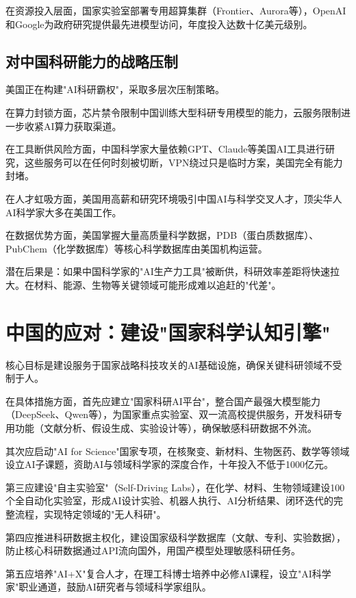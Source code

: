 在资源投入层面，国家实验室部署专用超算集群（Frontier、Aurora等），OpenAI和Google为政府研究提供最先进模型访问，年度投入达数十亿美元级别。

\subsection{对中国科研能力的战略压制}

美国正在构建"AI科研霸权"，采取多层次压制策略。

在算力封锁方面，芯片禁令限制中国训练大型科研专用模型的能力，云服务限制进一步收紧AI算力获取渠道。

在工具断供风险方面，中国科学家大量依赖GPT、Claude等美国AI工具进行研究，这些服务可以在任何时刻被切断，VPN绕过只是临时方案，美国完全有能力封堵。

在人才虹吸方面，美国用高薪和研究环境吸引中国AI与科学交叉人才，顶尖华人AI科学家大多在美国工作。

在数据优势方面，美国掌握大量高质量科学数据，PDB（蛋白质数据库）、PubChem（化学数据库）等核心科学数据库由美国机构运营。

潜在后果是：如果中国科学家的"AI生产力工具"被断供，科研效率差距将快速拉大。在材料、能源、生物等关键领域可能形成难以追赶的"代差"。

\section{中国的应对：建设"国家科学认知引擎"}

核心目标是建设服务于国家战略科技攻关的AI基础设施，确保关键科研领域不受制于人。

在具体措施方面，首先应建立"国家科研AI平台"，整合国产最强大模型能力（DeepSeek、Qwen等），为国家重点实验室、双一流高校提供服务，开发科研专用功能（文献分析、假设生成、实验设计等），确保敏感科研数据不外流。

其次应启动"AI for Science"国家专项，在核聚变、新材料、生物医药、数学等领域设立AI子课题，资助AI与领域科学家的深度合作，十年投入不低于1000亿元。

第三应建设"自主实验室"（Self-Driving Labs），在化学、材料、生物领域建设100个全自动化实验室，形成AI设计实验、机器人执行、AI分析结果、闭环迭代的完整流程，实现特定领域的"无人科研"。

第四应推进科研数据主权化，建设国家级科学数据库（文献、专利、实验数据），防止核心科研数据通过API流向国外，用国产模型处理敏感科研任务。

第五应培养"AI+X"复合人才，在理工科博士培养中必修AI课程，设立"AI科学家"职业通道，鼓励AI研究者与领域科学家组队。

